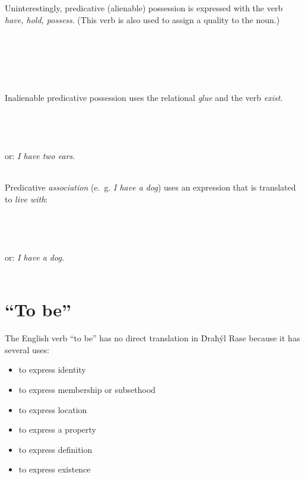 \documentclass{book}
\begin{document}
Uninterestingly, predicative (alienable) possession is expressed with the verb  \emph{have, hold, possess}. (This verb is also used to assign a quality to the noun.) \\
~\\
   \\
   \\
\emph{  } \\
~

Inalienable predicative possession uses the relational  \emph{glue} and the verb  \emph{exist}. \\
~\\
   \\
   \\
\emph{   } \\
or: \emph{I have two ears.} \\
~

Predicative \emph{association} (e.~g. \emph{I have a dog}) uses an expression that is translated to \emph{live with}: \\
~\\
  \\
  \\
  \\
or: \emph{I have a dog.} \\
~

\section{``To be''}

The English verb ``to be'' has no direct translation in Ḋraħýl Rase because it has several uses:

\begin{itemize}
    \item to express identity
    \item to express membership or subsethood
    \item to express location
    \item to express a property
    \item to express definition    
    \item to express existence
\end{itemize}
\end{document}
